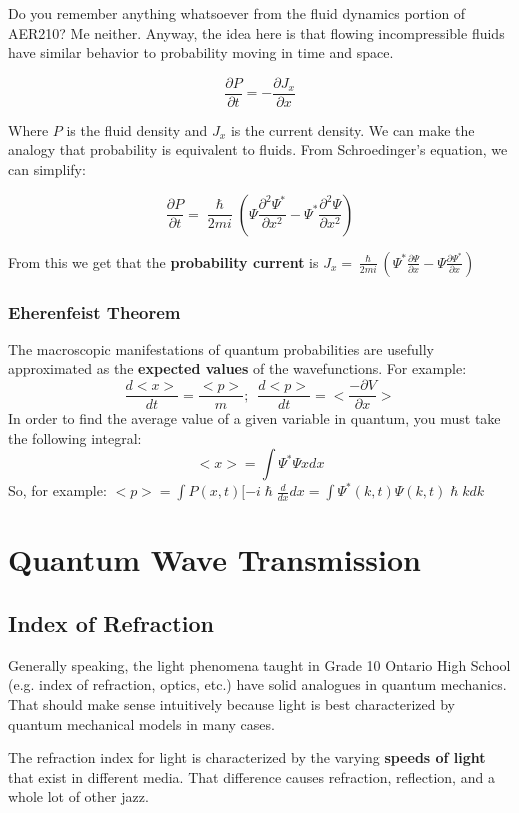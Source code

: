 \documentclass[a4paper,12pt]{report}
\begin{document}
Do you remember anything whatsoever from the fluid dynamics portion of AER210? Me neither. Anyway, the idea here is that flowing incompressible fluids have similar behavior to probability moving in time and space. 

$$\frac{\partial P}{\partial t} = -\frac{\partial J_x}{\partial x}$$

Where $P$ is the fluid density and $J_x$ is the current density. We can make the analogy that probability is equivalent to fluids. From Schroedinger's equation, we can simplify:

$$\frac{\partial P}{\partial t} = \frac{\hslash}{2mi} (\Psi\frac{\partial^2 \Psi^*}{\partial x^2} - \Psi^* \frac{\partial^2 \Psi}{\partial x^2})$$

From this we get that the \textbf{probability current} is $J_x = \frac{\hslash}{2mi} (\Psi^* \frac{\partial \Psi}{\partial x} - \Psi \frac{\partial \Psi^*}{\partial x})$

\subsection{Eherenfeist Theorem}

The macroscopic manifestations of quantum probabilities are usefully approximated as the \textbf{expected values} of the wavefunctions. For example:
$$\frac{d<x>}{dt} = \frac{<p>}{m};\,\,\, \frac{d<p>}{dt} = <\frac{-\partial V}{\partial x}>$$
In order to find the average value of a given variable in quantum, you must take the following integral:
$$<x> = \int \Psi^*\Psi x dx$$
So, for example: $<p> = \int P(x, t) [-i\hslash \frac{d}{dx}dx = \int \Psi^*(k, t) \Psi(k, t) \hslash k dk$

\chapter{Quantum Wave Transmission}
\section{Index of Refraction}
Generally speaking, the light phenomena taught in Grade 10 Ontario High School (e.g. index of refraction, optics, etc.) have solid analogues in quantum mechanics. That should make sense intuitively because light is best characterized by quantum mechanical models in many cases.

The refraction index for light is characterized by the varying \textbf{speeds of light} that exist in different media. That difference causes refraction, reflection, and a whole lot of other jazz. 
\end{document}
